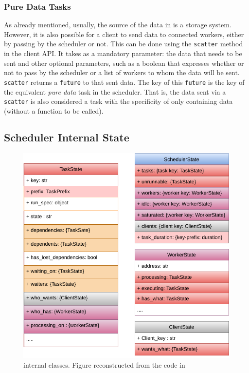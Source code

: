 

\subsubsection{Pure Data Tasks}\label{sec:puredata}
As already mentioned, usually, the source of the data in \dask is a storage system. However, it is also possible for a client to send data to connected workers, either by passing by the scheduler or not. 
This can be done using the \texttt{scatter} method in the client API. It takes as a mandatory parameter: the data that needs to be sent and other optional parameters, such as a boolean that expresses whether or not to pass by the scheduler or a list of workers to whom the data will be sent. 
\texttt{scatter} returns a \texttt{future} to that sent data. The key of this \texttt{future} is the key of the equivalent \textit{pure data} task in the \dask scheduler. That is, the data sent via a \texttt{scatter} is also considered a task with the specificity of only containing data (without a function to be called). 

\subsection{Scheduler Internal State}\label{sec:scheduler}
\begin{figure}
\includegraphics[scale=0.7]{figures/DaskScheduler.pdf}
\caption{\dask internal classes. Figure reconstructed from the code in~\cite{amal_distributed_2022}}
\label{figdaskinternal}
\end{figure}

